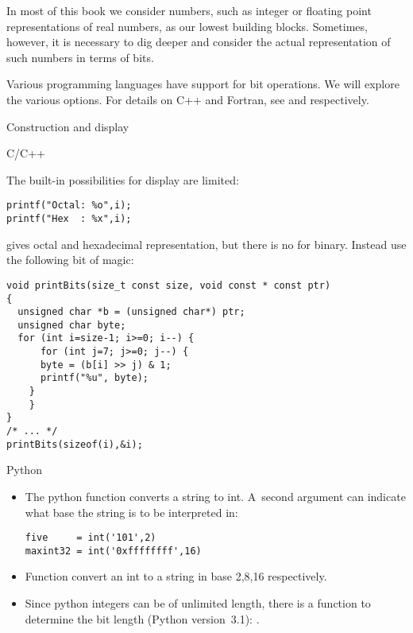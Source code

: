 

In most of this book we consider numbers, such as integer or floating
point representations of real numbers, as our lowest building
blocks. Sometimes, however, it is necessary to dig deeper and consider
the actual representation of such numbers in terms of bits.

Various programming languages have support for bit operations.
We will explore the various options.
For details on C++ and Fortran, see  and  respectively.

 {Construction and display}

 {C/C++}

The built-in possibilities for display are limited:
\begin{lstlisting}
printf("Octal: %o",i);
printf("Hex  : %x",i);
\end{lstlisting}
gives octal and hexadecimal representation, but there is no
for binary. Instead use the following bit of magic:
\begin{lstlisting}
void printBits(size_t const size, void const * const ptr)
{
  unsigned char *b = (unsigned char*) ptr;
  unsigned char byte;
  for (int i=size-1; i>=0; i--) {
      for (int j=7; j>=0; j--) {
	  byte = (b[i] >> j) & 1;
	  printf("%u", byte);
	}
    }
}
/* ... */
printBits(sizeof(i),&i);  
\end{lstlisting}

 {Python}

\begin{itemize}
\item The python  function converts a string to
  int. A~second argument can indicate what base the string is to be
  interpreted in:
\begin{lstlisting}
five     = int('101',2)
maxint32 = int('0xffffffff',16)
\end{lstlisting}
\item Function  
  convert an int to a string in base 2,8,16 respectively.
\item Since python integers can be of unlimited length, there is a
  function to determine the bit length (Python version~3.1):
  .
\end{itemize}

